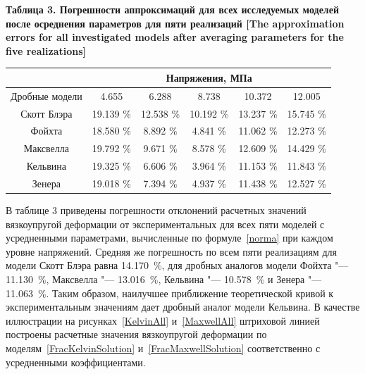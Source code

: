 \begin{center}
\smallskip

{\bf\footnotesize Таблица 3. Погрешности аппроксимаций для всех исследуемых моделей после осреднения параметров для пяти реализаций
[The approximation errors for all investigated models after averaging parameters for the five realizations] }


\begin{tabular}{|c||c|c|c|c|c|} %
\hline
\rule{0mm}{11pt}%
 & \multicolumn{5}{c|}{Напряжения, МПа}\\ \hline
\footnotesize Дробные модели & \footnotesize  4.655  & \footnotesize  6.288 & \footnotesize  8.738  & \footnotesize  10.372 & \footnotesize  12.005  \\
            \hline
            \rule{0mm}{12pt}%
            Скотт Блэра & 19.139 \% & 12.538 \% & 10.192 \% & 13.237 \% & 15.745 \%  \\
            Фойхта & 18.580 \% & \phantom{1}8.892 \% & \phantom{1}4.841 \% & 11.062 \% & 12.273 \%\\
            Максвелла & 19.792 \% & \phantom{1}9.671 \% & \phantom{1}8.578 \% & 12.609 \% & 14.429 \%\\
            Кельвина & 19.325 \% & \phantom{1}6.606 \% & \phantom{1}3.964 \% & 11.153 \% & 11.843 \%\\
            Зенера & 19.018 \% & \phantom{1}7.394 \% & \phantom{1}4.937 \% & 11.438 \% & 12.527 \%\\
            \hline
        \end{tabular}

\end{center}





В таблице 3 приведены погрешности отклонений расчетных значений вязкоупругой деформации от экспериментальных для всех пяти моделей с усредненными параметрами, вычисленные по формуле~\eqref{norma} при каждом уровне напряжений. Средняя же погрешность по всем пяти реализациям для модели Скотт Блэра равна 14.170~\%, для дробных аналогов модели Фойхта "--- 11.130~\%, Максвелла "--- 13.016~\%, Кельвина "--- 10.578~\% и Зенера "--- 11.063~\%.
Таким образом, наилучшее приближение теоретической кривой к экспериментальным значениям дает дробный аналог модели Кельвина. В качестве иллюстрации на рисунках~\ref{KelvinAll} и~\ref{MaxwellAll} штриховой линией построены расчетные значения вязкоупругой деформации по моделям~\eqref{FracKelvinSolution} и~\eqref{FracMaxwellSolution} соответственно с усредненными коэффициентами.


